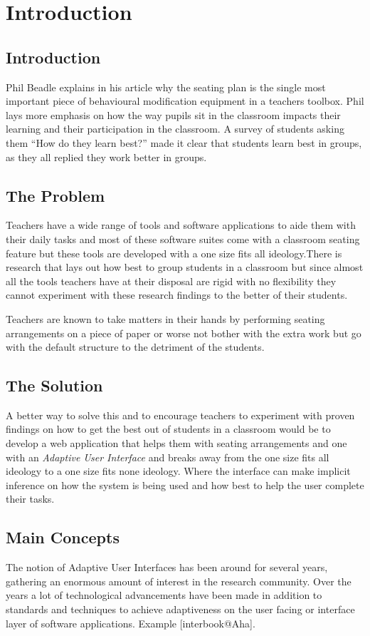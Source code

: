 \section{Introduction}
\subsection{Introduction} 
Phil Beadle \cite{website:TES} explains in his article why the seating plan is the single most important piece of behavioural modification equipment in a teachers toolbox. Phil lays more emphasis on how the way pupils sit in the classroom impacts their learning and their participation in the classroom. A survey of students asking them ``How do they learn best?'' made it clear that students learn best in groups, as they all replied they work better in groups.
\subsection{The Problem}
Teachers have a wide range of tools and software applications to aide them with their daily tasks and most of these software suites come with a classroom seating feature but these tools are developed with a one size fits all ideology.There is research that lays out how best to group students in a classroom but since almost all the tools teachers have at their disposal are rigid with no flexibility they cannot experiment with these research findings to the better of their students.

Teachers are known to take matters in their hands by performing seating arrangements on a piece of paper or worse not bother with the extra work but go with the default structure to the detriment of the students.

\subsection{The Solution}
A better way to solve this and to encourage teachers to experiment with proven findings on how to get the best out of students in a classroom would be to develop a web application that helps them with seating arrangements and one with an \emph{Adaptive User Interface} and breaks away from the one size fits all ideology to a one size fits none ideology. Where the interface can make implicit inference on how the system is being used and how best to help the user complete their tasks.

\subsection{Main Concepts}
The notion of Adaptive User Interfaces has been around for several years, gathering an enormous amount of interest in the research community. Over the years a lot of technological advancements have been made in addition to standards and techniques to achieve adaptiveness on the user facing or interface layer of software applications. Example [interbook@Aha]. \cite{brusilovsky2007user} 

